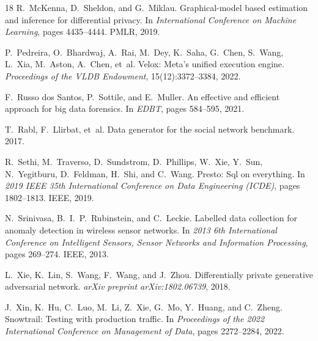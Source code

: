 \documentclass[11pt]{article}
\begin{document}
\begin{thebibliography}{18}
R.~McKenna, D.~Sheldon, and G.~Miklau. Graphical-model based
estimation and inference for differential privacy. In \textit{International
Conference on Machine Learning}, pages 4435--4444. PMLR, 2019.

P.~Pedreira, O.~Bhardwaj, A.~Rai, M.~Dey, K.~Saha, G.~Chen,
S.~Wang, L.~Xia, M.~Aston, A.~Chen, et~al. Velox: Meta's unified
execution engine. \textit{Proceedings of the VLDB Endowment},
15(12):3372--3384, 2022.

F.~Russo dos Santos, P.~Sottile, and E.~Muller. An effective and
efficient approach for big data forensics. In \textit{EDBT}, pages 584--595,
2021.

T.~Rabl, F.~Llirbat, et~al. Data generator for the social network
benchmark. 2017.

R.~Sethi, M.~Traverso, D.~Sundstrom, D.~Phillips, W.~Xie, Y.~Sun,
N.~Yegitburu, D.~Feldman, H.~Shi, and C.~Wang. Presto: Sql on
everything. In \textit{2019 IEEE 35th International Conference on Data
Engineering (ICDE)}, pages 1802--1813. IEEE, 2019.

N.~Srinivasa, B.~I.~P.~Rubinstein, and C.~Leckie. Labelled data
collection for anomaly detection in wireless sensor networks. In
\textit{2013 6th International Conference on Intelligent Sensors, Sensor
Networks and Information Processing}, pages 269--274. IEEE, 2013.

L.~Xie, K.~Lin, S.~Wang, F.~Wang, and J.~Zhou. Differentially private
generative adversarial network. \textit{arXiv preprint arXiv:1802.06739},
2018.

J.~Xin, K.~Hu, C.~Luo, M.~Li, Z.~Xie, G.~Mo, Y.~Huang, and C.~Zheng.
Snowtrail: Testing with production traffic. In \textit{Proceedings of the
2022 International Conference on Management of Data}, pages 2272--2284,
2022.

\end{thebibliography}
\end{document}
